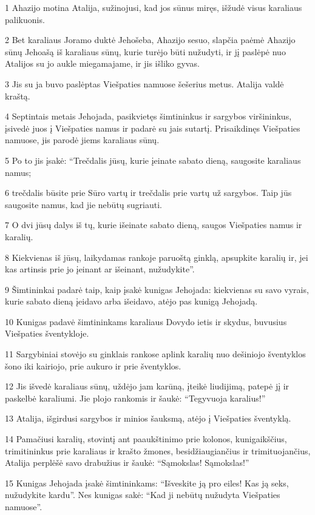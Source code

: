 \par 1 Ahazijo motina Atalija, sužinojusi, kad jos sūnus miręs, išžudė visus karaliaus palikuonis. 
\par 2 Bet karaliaus Joramo duktė Jehošeba, Ahazijo sesuo, slapčia paėmė Ahazijo sūnų Jehoašą iš karaliaus sūnų, kurie turėjo būti nužudyti, ir jį paslėpė nuo Atalijos su jo aukle miegamajame, ir jis išliko gyvas. 
\par 3 Jis su ja buvo paslėptas Viešpaties namuose šešerius metus. Atalija valdė kraštą. 
\par 4 Septintais metais Jehojada, pasikvietęs šimtininkus ir sargybos viršininkus, įsivedė juos į Viešpaties namus ir padarė su jais sutartį. Prisaikdinęs Viešpaties namuose, jis parodė jiems karaliaus sūnų. 
\par 5 Po to jis įsakė: “Trečdalis jūsų, kurie įeinate sabato dieną, saugosite karaliaus namus; 
\par 6 trečdalis būsite prie Sūro vartų ir trečdalis prie vartų už sargybos. Taip jūs saugosite namus, kad jie nebūtų sugriauti. 
\par 7 O dvi jūsų dalys iš tų, kurie išeinate sabato dieną, saugos Viešpaties namus ir karalių. 
\par 8 Kiekvienas iš jūsų, laikydamas rankoje paruoštą ginklą, apsupkite karalių ir, jei kas artinsis prie jo įeinant ar išeinant, nužudykite”. 
\par 9 Šimtininkai padarė taip, kaip įsakė kunigas Jehojada: kiekvienas su savo vyrais, kurie sabato dieną įeidavo arba išeidavo, atėjo pas kunigą Jehojadą. 
\par 10 Kunigas padavė šimtininkams karaliaus Dovydo ietis ir skydus, buvusius Viešpaties šventykloje. 
\par 11 Sargybiniai stovėjo su ginklais rankose aplink karalių nuo dešiniojo šventyklos šono iki kairiojo, prie aukuro ir prie šventyklos. 
\par 12 Jis išvedė karaliaus sūnų, uždėjo jam karūną, įteikė liudijimą, patepė jį ir paskelbė karaliumi. Jie plojo rankomis ir šaukė: “Tegyvuoja karalius!” 
\par 13 Atalija, išgirdusi sargybos ir minios šauksmą, atėjo į Viešpaties šventyklą. 
\par 14 Pamačiusi karalių, stovintį ant paaukštinimo prie kolonos, kunigaikščius, trimitininkus prie karaliaus ir krašto žmones, besidžiaugiančius ir trimituojančius, Atalija perplėšė savo drabužius ir šaukė: “Sąmokslas! Sąmokslas!” 
\par 15 Kunigas Jehojada įsakė šimtininkams: “Išveskite ją pro eiles! Kas ją seks, nužudykite kardu”. Nes kunigas sakė: “Kad ji nebūtų nužudyta Viešpaties namuose”. 
